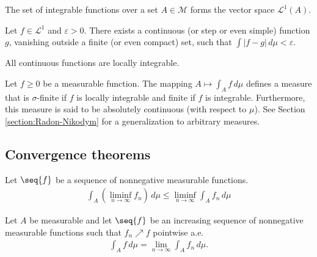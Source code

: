     \begin{definition}
        The set of integrable functions over a set $A\in\mathcal{M}$ forms the vector space $\mathcal{L}^1(A)$.
    \end{definition}

    \begin{property}
        Let $f\in\mathcal{L}^1$ and $\varepsilon>0$. There exists a continuous (or step or even simple) function $g$, vanishing outside a finite (or even compact) set, such that $\int|f-g|\,d\mu<\varepsilon$.
    \end{property}

    \begin{example}
        All continuous functions are locally integrable.
    \end{example}

    \begin{property}\label{lebesgue:measure_by_integral}
        Let $f\geq0$ be a measurable function. The mapping $A\mapsto\int_Af\,d\mu$ defines a measure that is $\sigma$-finite if $f$ is locally integrable and finite if $f$ is integrable. Furthermore, this measure is said to be absolutely continuous (with respect to $\mu$). See Section \ref{section:Radon-Nikodym} for a generalization to arbitrary measures.
    \end{property}

\subsection{Convergence theorems}

    \begin{theorem}\label{lebesgue:fatous_lemma}
        Let $\seq{f}$ be a sequence of nonnegative measurable functions.
        \begin{gather}
            \int_A\left(\liminf_{n\rightarrow\infty}f_n\right)\,d\mu \leq \liminf_{n\rightarrow\infty}\int_Af_n\,d\mu
        \end{gather}
    \end{theorem}
    \begin{theorem}\label{lebesgue:monotone_convergence_theorem}
        Let $A$ be measurable and let $\seq{f}$ be an increasing sequence of nonnegative measurable functions such that $f_n\nearrow f$ pointwise a.e.
        \begin{gather}
            \int_Af\,d\mu = \lim_{n\rightarrow\infty}\int_Af_n\,d\mu.
        \end{gather}
    \end{theorem}

